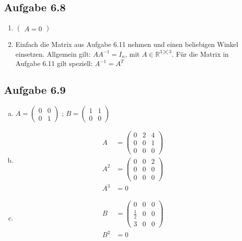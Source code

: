 \documentclass{standalone}
\begin{document}
\subsection{Aufgabe 6.8}
\begin{enumerate}
    \item $\begin{pmatrix}
        A = 0
    \end{pmatrix}$
    \item Einfach die Matrix aus Aufgabe 6.11 nehmen und einen beliebigen Winkel einsetzen. Allgemein gilt: $AA^{-1} = I_n$, mit $A \in \mathbb{R}^{3 \bigtimes 3}$. Für die Matrix in Aufgabe 6.11 gilt speziell: $A^{-1}=A^T$
\end{enumerate}
    
\subsection{Aufgabe 6.9}
\begin{enumerate}[a)]
    \item $A = \begin{pmatrix}
        0 & 0 \\
        0 & 1
    \end{pmatrix}\text{ ; }
    B = \begin{pmatrix}
        1 & 1 \\
        0 & 0
    \end{pmatrix}
    $
    \item \begin{align}
        A &= \begin{pmatrix}
            0 & 2 & 4 \\
            0 & 0 & 1 \\
            0 & 0 & 0
        \end{pmatrix}\\
        A^2 &= \begin{pmatrix}
            0 & 0 & 2 \\
            0 & 0 & 0 \\
            0 & 0 & 0
        \end{pmatrix} \\
        A^3 &= 0
    \end{align}
    \item \begin{align}
        B &= \begin{pmatrix}
            0 & 0 & 0 \\
            \frac{1}{2} & 0 & 0 \\
            3 & 0 & 0
        \end{pmatrix}\\
        B^2 &= 0
    \end{align}
\end{enumerate}
\end{document}
